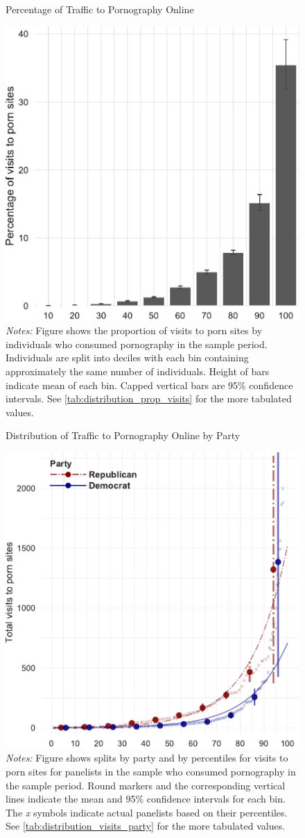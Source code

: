 \documentclass[12pt, letterpaper]{article}
\begin{document}
\begin{figure}
	\centering
	\caption{Percentage of Traffic to Pornography Online}
	\includegraphics[width=.5\linewidth]{../figs/distribution_proportion_visits_to_adultsites.pdf}
	\caption*{\footnotesize \emph{Notes:} 
		Figure shows the proportion of visits to porn sites by individuals who consumed pornography in the sample period.
		Individuals are split into deciles with each bin containing approximately the same number of individuals.
		Height of bars indicate mean of each bin.
		Capped vertical bars are 95\% confidence intervals.
		See \cref{tab:distribution_prop_visits} for the more tabulated values.
	}
	\label{fig:distribution_prop_visits}
\end{figure}



\begin{figure}
	\centering
	\caption{Distribution of Traffic to Pornography Online by Party}
	\includegraphics[width=.55\linewidth]{../figs/distribution_visits_to_adultsites_by_party.pdf}
	\caption*{\footnotesize \emph{Notes:} 
		Figure shows splits by party and by percentiles for visits to porn sites for panelists in the sample who consumed pornography in the sample period.
		Round markers and the corresponding vertical lines indicate the mean and 95\% confidence intervals for each bin.
		The \emph{x} symbols indicate actual panelists based on their percentiles.
		See \cref{tab:distribution_visits_party} for the more tabulated values.
	}
	\label{fig:distribution_visits_party}
\end{figure}
\end{document}
